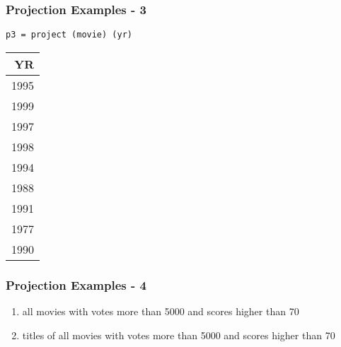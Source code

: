 \documentclass[dvipsnames]{beamer}
\theoremstyle{plain}
\begin{document}
\begin{frame}[fragile]
  \frametitle{Projection Examples - 3}

  \begin{example}
    \begin{lstlisting}
p3 = project (movie) (yr)
    \end{lstlisting}

    \pause
    \begin{tiny}
    \begin{table}
      \begin{tabular}{|r|}\hline
  YR\\\hline\hline
1995\\\hline
1999\\\hline
1997\\\hline
1998\\\hline
1994\\\hline
1988\\\hline
1991\\\hline
1977\\\hline
1990\\\hline
      \end{tabular}
    \end{table}
    \end{tiny}
  \end{example}
\end{frame}

\begin{frame}
  \frametitle{Projection Examples - 4}

  \begin{example}
    \pause
    \begin{enumerate}
      \item all movies with votes more than 5000 and scores higher than 70

      \pause
      \item titles of all movies with votes more than 5000 and scores higher
        than 70
    \end{enumerate}
  \end{example}
\end{frame}
\end{document}
